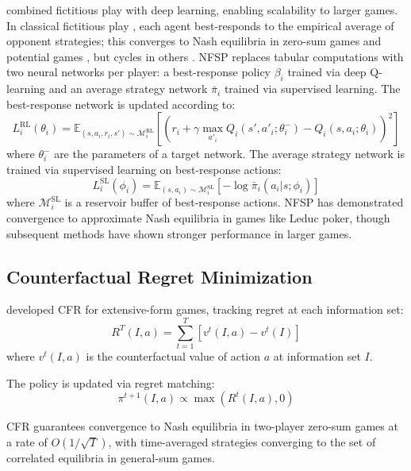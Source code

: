 \citet{HeinrichSilver2016} combined fictitious play with deep learning, enabling scalability to larger games. In classical fictitious play \citep{Brown1951}, each agent best-responds to the empirical average of opponent strategies; this converges to Nash equilibria in zero-sum games \citep{Robinson1951} and potential games \citep{MondererShapley1996}, but cycles in others \citep{Shapley1964}. NFSP replaces tabular computations with two neural networks per player: a best-response policy $\beta_i$ trained via deep Q-learning and an average strategy network $\bar{\pi}_i$ trained via supervised learning. The best-response network is updated according to:
\begin{equation}
L_i^{\text{RL}}(\theta_i) = \mathbb{E}_{(s,a_i,r_i,s') \sim \mathcal{M}_i^{\text{RL}}} [(r_i + \gamma \max_{a'_i} Q_i(s', a'_i; \theta_i^-) - Q_i(s, a_i; \theta_i))^2]
\end{equation}
where $\theta_i^-$ are the parameters of a target network. The average strategy network is trained via supervised learning on best-response actions:
\begin{equation}
L_i^{\text{SL}}(\phi_i) = \mathbb{E}_{(s,a_i) \sim \mathcal{M}_i^{\text{SL}}} [-\log \bar{\pi}_i(a_i|s; \phi_i)]
\end{equation}
where $\mathcal{M}_i^{\text{SL}}$ is a reservoir buffer of best-response actions. NFSP has demonstrated convergence to approximate Nash equilibria in games like Leduc poker, though subsequent methods have shown stronger performance in larger games.

\subsection{Counterfactual Regret Minimization}

\citet{zinkevich2008} developed CFR for extensive-form games, tracking regret at each information set:
\begin{equation}
R^T(I,a) = \sum_{t=1}^{T} [v^t(I,a) - v^t(I)]
\end{equation}
where $v^t(I,a)$ is the counterfactual value of action $a$ at information set $I$.

The policy is updated via regret matching:
\begin{equation}
\pi^{t+1}(I,a) \propto \max(R^t(I,a), 0)
\end{equation}

CFR guarantees convergence to Nash equilibria in two-player zero-sum games at a rate of $O(1/\sqrt{T})$, with time-averaged strategies converging to the set of correlated equilibria in general-sum games.

